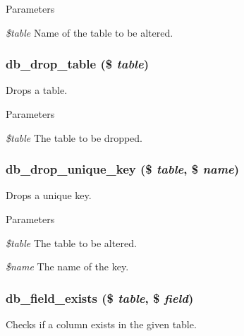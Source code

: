 \begin{DoxyParams}{Parameters}
\item[{\em \$table}]Name of the table to be altered. \end{DoxyParams}
\hypertarget{group__schemaapi_ga5d744ae7a6fe2c9eaa1c7bd350a071d3}{
\subsubsection[{db\_\-drop\_\-table}]{\setlength{\rightskip}{0pt plus 5cm}db\_\-drop\_\-table (\$ {\em table})}}
\label{group__schemaapi_ga5d744ae7a6fe2c9eaa1c7bd350a071d3}
Drops a table.


\begin{DoxyParams}{Parameters}
\item[{\em \$table}]The table to be dropped. \end{DoxyParams}
\hypertarget{group__schemaapi_gab06ca0fe63625f37a649cf3432fd8ffe}{
\subsubsection[{db\_\-drop\_\-unique\_\-key}]{\setlength{\rightskip}{0pt plus 5cm}db\_\-drop\_\-unique\_\-key (\$ {\em table}, \/  \$ {\em name})}}
\label{group__schemaapi_gab06ca0fe63625f37a649cf3432fd8ffe}
Drops a unique key.


\begin{DoxyParams}{Parameters}
\item[{\em \$table}]The table to be altered. \item[{\em \$name}]The name of the key. \end{DoxyParams}
\hypertarget{group__schemaapi_ga6b39d7c0876ab53b1588ff9e40677c42}{
\subsubsection[{db\_\-field\_\-exists}]{\setlength{\rightskip}{0pt plus 5cm}db\_\-field\_\-exists (\$ {\em table}, \/  \$ {\em field})}}
\label{group__schemaapi_ga6b39d7c0876ab53b1588ff9e40677c42}
Checks if a column exists in the given table.


